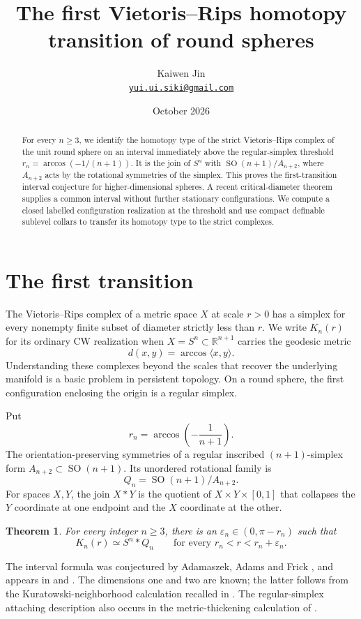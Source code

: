 \documentclass[11pt,a4paper]{article}
\title{The first Vietoris--Rips homotopy transition of round spheres}
\author{Kaiwen Jin\\[3pt]\small\href{mailto:yui.ui.siki@gmail.com}{\texttt{yui.ui.siki@gmail.com}}}
\date{October 2026}
\newtheorem{theorem}{Theorem}[section]
\theoremstyle{definition}
\DeclareMathOperator{\SO}{SO}
\newcommand{\R}{\mathbb R}
\begin{document}
\maketitle
\begin{abstract}
For every \(n\geq3\), we identify the homotopy type of the strict Vietoris--Rips complex of the unit round sphere on an interval immediately above the regular-simplex threshold
\(r_n=\arccos(-1/(n+1))\).
It is the join of \(S^n\) with \(\SO(n+1)/A_{n+2}\), where \(A_{n+2}\) acts by the rotational symmetries of the simplex. This proves the first-transition interval conjecture for higher-dimensional spheres. A recent critical-diameter theorem supplies a common interval without further stationary configurations. We compute a closed labelled configuration realization at the threshold and use compact definable sublevel collars to transfer its homotopy type to the strict complexes.
\end{abstract}

\section{The first transition}
The Vietoris--Rips complex of a metric space \(X\) at scale \(r>0\) has a simplex for every nonempty finite subset of diameter strictly less than \(r\). We write \(K_n(r)\) for its ordinary CW realization when \(X=S^n\subset\R^{n+1}\) carries the geodesic metric
\[
d(x,y)=\arccos\langle x,y\rangle.
\]
Understanding these complexes beyond the scales that recover the underlying manifold is a basic problem in persistent topology. On a round sphere, the first configuration enclosing the origin is a regular simplex.

Put
\[
r_n=\arccos\!\left(-\frac1{n+1}\right).
\]
The orientation-preserving symmetries of a regular inscribed \((n+1)\)-simplex form \(A_{n+2}\subset\SO(n+1)\). Its unordered rotational family is
\[
Q_n=\SO(n+1)/A_{n+2}.
\]
For spaces \(X,Y\), the join \(X*Y\) is the quotient of \(X\times Y\times[0,1]\) that collapses the \(Y\) coordinate at one endpoint and the \(X\) coordinate at the other.

\begin{theorem}\label{thm:main}
For every integer \(n\geq3\), there is an
\(\varepsilon_n\in(0,\pi-r_n)\) such that
\[
K_n(r)\simeq S^n*Q_n
\qquad\text{for every }r_n<r<r_n+\varepsilon_n .
\]
\end{theorem}

The interval formula was conjectured by Adamaszek, Adams and Frick \cite[Conjecture~5.7]{AAF}, and appears in \cite[Conjecture~7.2]{ABV} and \cite[Conjecture~7.8]{LMO}. The dimensions one and two are known; the latter follows from the Kuratowski-neighborhood calculation recalled in \cite[Corollary~7.5]{LMO}. The regular-simplex attaching description also occurs in the metric-thickening calculation of \cite[Section~5]{AAF}.
\end{document}

